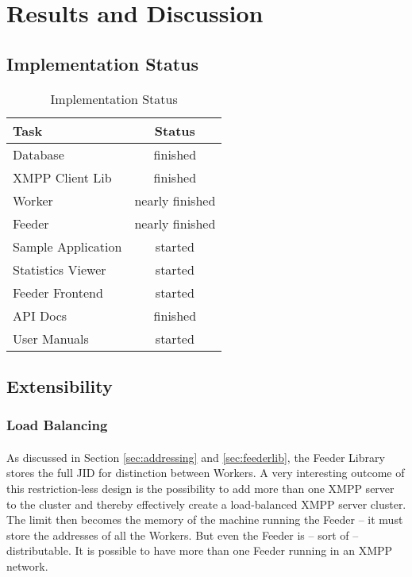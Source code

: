 \section{Results and Discussion}
\label{sec:discussion}

\subsection{Implementation Status}

\begin{table}[H]
\begin{tabularx}{\linewidth}{lc}
\toprule
\textbf{Task} & \textbf{Status} \\
\midrule
\endhead
Database           & finished \\
XMPP Client Lib    & finished \\
Worker             & nearly finished \\
Feeder             & nearly finished \\
Sample Application & started \\
Statistics Viewer  & started \\
Feeder Frontend    & started \\
API Docs           & finished \\
User Manuals       & started \\
\bottomrule
\end{tabularx}
\caption{Implementation Status}
\label{tab:impstatus}
\end{table}


\subsection{Extensibility}
\label{sec:extensibility}

\subsubsection{Load Balancing}
\paragraph{}
As discussed in Section \ref{sec:addressing} and \ref{sec:feederlib}, the Feeder Library stores the full JID for distinction between Workers. A very interesting outcome of this restriction-less design is the possibility to add more than one XMPP server to the cluster and thereby effectively create a load-balanced XMPP server cluster. The limit then becomes the memory of the machine running the Feeder -- it must store the addresses of all the Workers. But even the Feeder is -- sort of -- distributable. It is possible to have more than one Feeder running in an XMPP network.

